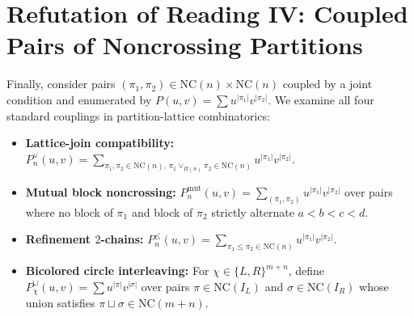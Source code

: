 \documentclass[11pt]{article}
\theoremstyle{plain}
\theoremstyle{definition}
\newcommand{\NC}{\mathrm{NC}}
\begin{document}
\section{Refutation of Reading IV: Coupled Pairs of Noncrossing Partitions}

Finally, consider pairs $(\pi_1, \pi_2) \in \NC(n) \times \NC(n)$ coupled by a joint condition and enumerated by $P(u, v) = \sum u^{|\pi_1|} v^{|\pi_2|}$. We examine all four standard couplings in partition-lattice combinatorics:
\begin{itemize}\setlength{\itemsep}{2pt}
  \item[(a)] \textbf{Lattice-join compatibility:} $P_n^{\vee}(u, v) = \sum_{\pi_1, \pi_2 \in \NC(n), \, \pi_1 \vee_{\Pi(n)} \pi_2 \in \NC(n)} u^{|\pi_1|} v^{|\pi_2|}$.
  \item[(b)] \textbf{Mutual block noncrossing:} $P_n^{\mathrm{mut}}(u, v) = \sum_{(\pi_1, \pi_2)} u^{|\pi_1|} v^{|\pi_2|}$ over pairs where no block of $\pi_1$ and block of $\pi_2$ strictly alternate $a < b < c < d$.
  \item[(c)] \textbf{Refinement $2$-chains:} $P_n^{\le}(u, v) = \sum_{\pi_1 \le \pi_2 \in \NC(n)} u^{|\pi_1|} v^{|\pi_2|}$.
  \item[(d)] \textbf{Bicolored circle interleaving:} For $\chi \in \{L, R\}^{m+n}$, define $P_\chi^{\sqcup}(u, v) = \sum u^{|\pi|} v^{|\sigma|}$ over pairs $\pi \in \NC(I_L)$ and $\sigma \in \NC(I_R)$ whose union satisfies $\pi \sqcup \sigma \in \NC(m+n)$.
\end{itemize}
\end{document}
